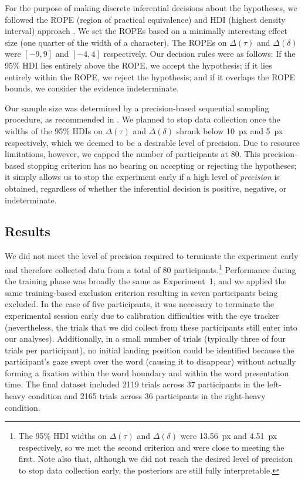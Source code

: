 \documentclass[doc,biblatex,floatsintext]{apa7}
\begin{document}
For the purpose of making discrete inferential decisions about the hypotheses, we followed the ROPE (region of practical equivalence) and HDI (highest density interval) approach \parencite{Kruschke:2015}. We set the ROPEs based on a minimally interesting effect size (one quarter of the width of a character). The ROPEs on $\Delta(\tau)$ and $\Delta(\delta)$ were $[-9, 9]$ and $[-4, 4]$ respectively. Our decision rules were as follows: If the 95\% HDI lies entirely above the ROPE, we accept the hypothesis; if it lies entirely within the ROPE, we reject the hypothesis; and if it overlaps the ROPE bounds, we consider the evidence indeterminate.

Our sample size was determined by a precision-based sequential sampling procedure, as recommended in \textcite{Kruschke:2015}. We planned to stop data collection once the widths of the 95\% HDIs on $\Delta(\tau)$ and $\Delta(\delta)$ shrank below 10~px and 5~px respectively, which we deemed to be a desirable level of precision. Due to resource limitations, however, we capped the number of participants at 80. This precision-based stopping criterion has no bearing on accepting or rejecting the hypotheses; it simply allows us to stop the experiment early if a high level of \textit{precision} is obtained, regardless of whether the inferential decision is positive, negative, or indeterminate.

\subsection{Results}

We did not meet the level of precision required to terminate the experiment early and therefore collected data from a total of 80 participants.\footnote{The 95\% HDI widths on $\Delta(\tau)$ and $\Delta(\delta)$ were 13.56~px and 4.51~px respectively, so we met the second criterion and were close to meeting the first. Note also that, although we did not reach the desired level of precision to stop data collection early, the posteriors are still fully interpretable.} Performance during the training phase was broadly the same as Experiment~1, and we applied the same training-based exclusion criterion resulting in seven participants being excluded. In the case of five participants, it was necessary to terminate the experimental session early due to calibration difficulties with the eye tracker (nevertheless, the trials that we did collect from these participants still enter into our analyses). Additionally, in a small number of trials (typically three of four trials per participant), no initial landing position could be identified because the participant's gaze swept over the word (causing it to disappear) without actually forming a fixation within the word boundary and within the word presentation time. The final dataset included 2119 trials across 37 participants in the left-heavy condition and 2165 trials across 36 participants in the right-heavy condition.
\end{document}
